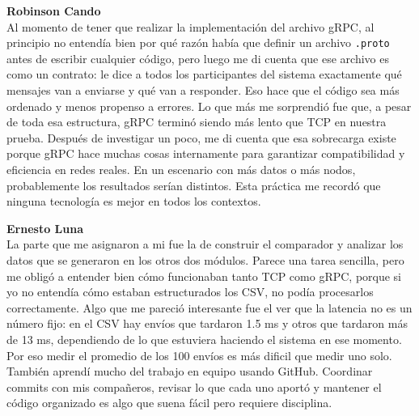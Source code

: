 \documentclass[12pt,a4paper]{article}
\begin{document}
\vspace{0.5cm}
\textbf{Robinson Cando} \\
Al momento de tener que realizar la implementación del archivo gRPC, al principio no entendía bien por qué razón había que definir un archivo \texttt{.proto} antes de escribir cualquier código, pero luego me di cuenta que ese archivo es como un contrato: le dice a todos los participantes del sistema exactamente qué mensajes van a enviarse y qué van a responder. Eso hace que el código sea más ordenado y menos propenso a errores. Lo que más me sorprendió fue que, a pesar de toda esa estructura, gRPC terminó siendo más lento que TCP en nuestra prueba. Después de investigar un poco, me di cuenta que esa sobrecarga existe porque gRPC hace muchas cosas internamente para garantizar compatibilidad y eficiencia en redes reales. En un escenario con más datos o más nodos, probablemente los resultados serían distintos. Esta práctica me recordó que ninguna tecnología es mejor en todos los contextos.

\vspace{0.5cm}
\textbf{Ernesto Luna} \\
La parte que me asignaron a mi fue la de construir el comparador y analizar los datos que se generaron en los otros dos módulos. Parece una tarea sencilla, pero me obligó a entender bien cómo funcionaban tanto TCP como gRPC, porque si yo no entendía cómo estaban estructurados los CSV, no podía procesarlos correctamente. Algo que me pareció interesante fue el ver que la latencia no es un número fijo: en el CSV hay envíos que tardaron 1.5 ms y otros que tardaron más de 13 ms, dependiendo de lo que estuviera haciendo el sistema en ese momento. Por eso medir el promedio de los 100 envíos es más dificil que medir uno solo. También aprendí mucho del trabajo en equipo usando GitHub. Coordinar commits con mis compañeros, revisar lo que cada uno aportó y mantener el código organizado es algo que suena fácil pero requiere disciplina. 
\end{document}
